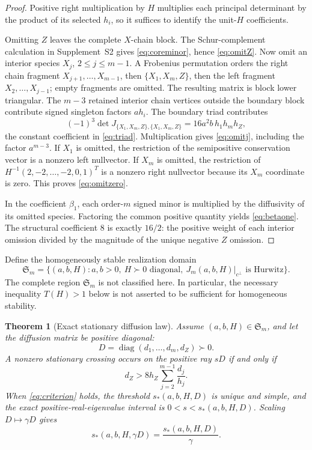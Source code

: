 \documentclass[11pt]{article}
\newtheorem{theorem}{Theorem}[section]
\theoremstyle{definition}
\newcommand{\diag}{\operatorname{diag}}
\newcommand{\1}{\mathbf 1}
\begin{document}
\begin{proof}
Positive right multiplication by $H$ multiplies each principal determinant by
the product of its selected $h_i$, so it suffices to identify the unit-$H$
coefficients.

Omitting $Z$ leaves the complete $X$-chain block.  The Schur-complement
calculation in Supplement~S2 gives \eqref{eq:coreminor}, hence
\eqref{eq:omitZ}.  Now omit an interior species $X_j$, $2\le j\le m-1$.
A Frobenius permutation orders the right chain fragment
$X_{j+1},\ldots,X_{m-1}$, then $\{X_1,X_m,Z\}$, then the left fragment
$X_2,\ldots,X_{j-1}$; empty fragments are omitted.  The resulting matrix is
block lower triangular.  The $m-3$ retained
interior chain vertices outside the boundary block contribute signed singleton
factors $a h_i$.  The boundary triad contributes
\[
 (-1)^3\det J_{\{X_1,X_m,Z\},\{X_1,X_m,Z\}}
 =16a^2b\,h_1h_mh_Z,
\]
the constant coefficient in \eqref{eq:triad}.  Multiplication gives
\eqref{eq:omitj}, including the factor $a^{m-3}$.  If $X_1$ is omitted, the
restriction of the semipositive conservation vector is a nonzero left
nullvector.  If $X_m$ is omitted, the restriction of
$H^{-1}(2,-2,\ldots,-2,0,1)^T$ is a nonzero right nullvector because its
$X_m$ coordinate is zero.  This proves \eqref{eq:omitzero}.

In the coefficient $\beta_1$, each order-$m$ signed minor is multiplied by the
diffusivity of its omitted species.  Factoring the common positive quantity
yields \eqref{eq:betaone}.  The structural coefficient $8$ is exactly
$16/2$: the positive weight of each interior omission divided by the magnitude
of the unique negative $Z$ omission.
\end{proof}

Define the homogeneously stable realization domain
\begin{equation}\label{eq:stable-domain}
 \mathfrak S_m=\{(a,b,H):a,b>0,\ H\succ0\text{ diagonal},\
 J_m(a,b,H)|_{c^\perp}\text{ is Hurwitz}\}.
\end{equation}
The complete region $\mathfrak S_m$ is not classified here.  In
particular, the necessary inequality $T(H)>1$ below is not asserted to be
sufficient for homogeneous stability.

\begin{theorem}[Exact stationary diffusion law]\label{thm:diffusionlaw}
Assume $(a,b,H)\in\mathfrak S_m$, and let the diffusion matrix be positive
diagonal:
\[
 D=\diag(d_1,\ldots,d_m,d_Z)\succ0.
\]
A nonzero
stationary crossing occurs on the positive ray $sD$ if and only if
\begin{equation}\label{eq:criterion}
 \boxed{\quad d_Z>8h_Z\sum_{j=2}^{m-1}\frac{d_j}{h_j}.\quad}
\end{equation}
When \eqref{eq:criterion} holds, the threshold $s_*(a,b,H,D)$ is unique and
simple, and the exact positive-real-eigenvalue interval is
$0<s<s_*(a,b,H,D)$.  Scaling $D\mapsto\gamma D$ gives
\[
 s_*(a,b,H,\gamma D)=\frac{s_*(a,b,H,D)}{\gamma}.
\]
\end{theorem}
\end{document}
